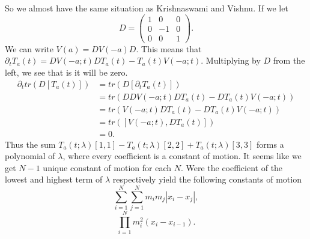 \documentclass[english,master]{liumaiex}
\theoremstyle{plain}
\theoremstyle{definition}
\begin{document}
So we almost have the same situation as Krishnaswami and Vishnu. If we let
\begin{equation}
	D = 
\begin{pmatrix}
	1 & 0 & 0 \\
	0 & -1 & 0 \\
	0 & 0 & 1
\end{pmatrix}.
\end{equation}
We can write $V(a) = DV(-a)D$. This means that $\partial_t T_a(t) = DV(-a;t)DT_a(t) - T_a(t)V(-a;t)$. Multiplying by $D$ from the left, we see that is it will be zero.
\begin{equation}
\begin{aligned}
	\partial_t tr(D [T_a(t)])
	&= tr(D [\partial_t T_a(t)]) \\
	&= tr(DDV(-a;t)DT_a(t) - DT_a(t)V(-a;t)) \\
	&= tr(V(-a;t)DT_a(t) - DT_a(t)V(-a;t)) \\
	&= tr([V(-a;t), DT_a(t)]) \\
	&= 0.
\end{aligned}
\end{equation}
Thus the sum $T_a(t;\lambda)[1,1] - T_a(t;\lambda)[2,2] + T_a(t;\lambda)[3,3]$ forms a polynomial of $\lambda$, where every coefficient is a constant of motion. It seems like we get $N-1$ unique constant of motion for each $N$. Were the coefficient of the lowest and highest term of $\lambda$ respectively yield the following constants of motion
\begin{equation}
	\sum_{i=1}^{N}\sum_{j=1}^N m_i m_j |x_i - x_j|,
\end{equation}
\begin{equation}
	\prod_{i=1}^{N} m_i^2 (x_i - x_{i-1}).
\end{equation}

%
%




%
%


\end{document}
